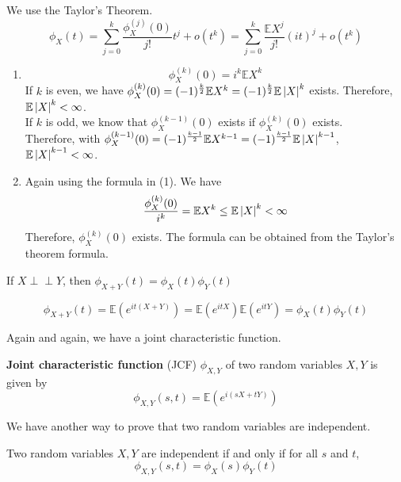 \documentclass{huhtakm-template-book}
\newcommand{\independent}{\perp\!\!\!\perp}
\newcommand{\expect}{\mathbb{E}}
\begin{document}
\begin{proofing}
	We use the Taylor's Theorem.
	\begin{equation*}
		\phi_{X}(t)=\sum_{j=0}^{k}\frac{\phi_{X}^{(j)}(0)}{j!}t^{j}+o(t^{k})=\sum_{j=0}^{k}\frac{\expect X^{j}}{j!}(it)^{j}+o(t^{k})
	\end{equation*}
	\begin{enumerate}
		\item 
		\begin{equation*}
			\phi_{X}^{(k)}(0)=i^{k}\expect X^{k}
		\end{equation*}
		If $k$ is even, we have $\phi_{X}^{(k)}(0)=(-1)^{\frac{k}{2}}\expect X^{k}=(-1)^{\frac{k}{2}}\expect\abs{X}^{k}$ exists. Therefore, $\expect\abs{X}^{k}<\infty$.\\
		If $k$ is odd, we know that $\phi_{X}^{(k-1)}(0)$ exists if $\phi_{X}^{(k)}(0)$ exists.\\
		Therefore, with $\phi_{X}^{(k-1)}(0)=(-1)^{\frac{k-1}{2}}\expect X^{k-1}=(-1)^{\frac{k-1}{2}}\expect\abs{X}^{k-1}$, $\expect\abs{X}^{k-1}<\infty$.
		\item Again using the formula in (1). We have
		\begin{equation*}
			\frac{\phi_{X}^{(k)}(0)}{i^{k}}=\expect X^{k}\leq\expect\abs{X}^{k}<\infty
		\end{equation*}
		Therefore, $\phi_{X}^{(k)}(0)$ exists. The formula can be obtained from the Taylor's theorem formula.
	\end{enumerate}
\end{proofing}
\begin{thm}
	If $X\independent Y$, then $\phi_{X+Y}(t)=\phi_{X}(t)\phi_{Y}(t)$
\end{thm}
\begin{proofing}
	\begin{equation*}
		\phi_{X+Y}(t)=\expect(e^{it(X+Y)})=\expect(e^{itX})\expect(e^{itY})=\phi_{X}(t)\phi_{Y}(t)
	\end{equation*}
\end{proofing}
Again and again, we have a joint characteristic function.
\begin{defn}
	\textbf{Joint characteristic function} (JCF) $\phi_{X,Y}$ of two random variables $X,Y$ is given by
	\begin{equation*}
		\phi_{X,Y}(s,t)=\expect(e^{i(sX+tY)})
	\end{equation*}
\end{defn}
We have another way to prove that two random variables are independent.
\begin{thm}
	\label{Chapter 7 (Theorem) Independence via CF}
	Two random variables $X,Y$ are independent if and only if for all $s$ and $t$,
	\begin{equation*}
		\phi_{X,Y}(s,t)=\phi_{X}(s)\phi_{Y}(t)
	\end{equation*}
\end{thm}
\end{document}
